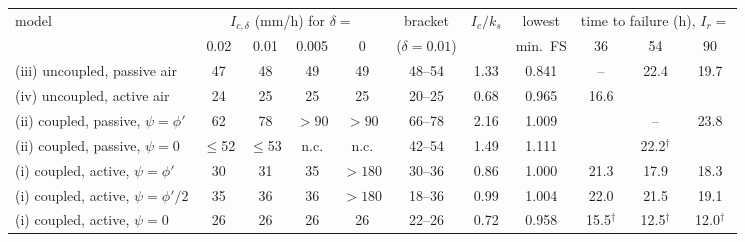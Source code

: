 \begin{tabular}{lccccccccc c}
\toprule
model & \multicolumn{4}{c}{$I_{c,\delta}$ (mm/h) for $\delta=$} & bracket & $I_c/k_s$ & lowest & \multicolumn{3}{c}{time to failure (h), $I_r=$}\\
 & 0.02 & 0.01 & 0.005 & 0 & ($\delta=0.01$) & & min.\ FS & 36 & 54 & 90\\
\midrule
(iii) uncoupled, passive air & 47 & 48 & 49 & 49 & 48--54 & 1.33 & 0.841 & -- & 22.4 & 19.7\\
(iv) uncoupled, active air & 24 & 25 & 25 & 25 & 20--25 & 0.68 & 0.965 & 16.6 &  & \\
(ii) coupled, passive, $\psi=\phi'$ & 62 & 78 & $>90$ & $>90$ & 66--78 & 2.16 & 1.009 &  & -- & 23.8\\
(ii) coupled, passive, $\psi=0$ & $\le$52 & $\le$53 & n.c. & n.c. & 42--54 & 1.49 & 1.111 &  & 22.2$^\dagger$ & \\
(i) coupled, active, $\psi=\phi'$ & 30 & 31 & 35 & $>180$ & 30--36 & 0.86 & 1.000 & 21.3 & 17.9 & 18.3\\
(i) coupled, active, $\psi=\phi'/2$ & 35 & 36 & 36 & $>180$ & 18--36 & 0.99 & 1.004 & 22.0 & 21.5 & 19.1\\
(i) coupled, active, $\psi=0$ & 26 & 26 & 26 & 26 & 22--26 & 0.72 & 0.958 & 15.5$^\dagger$ & 12.5$^\dagger$ & 12.0$^\dagger$\\
\bottomrule
\end{tabular}
